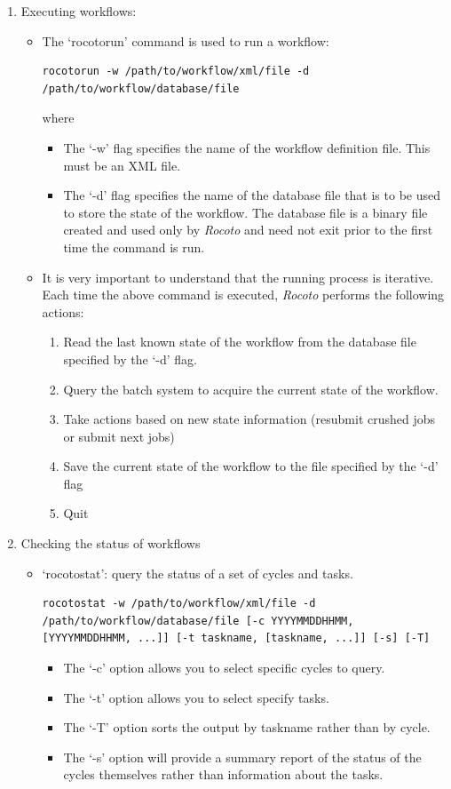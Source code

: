 \documentclass[11pt,fleqn]{report}              %
\begin{document}
\begin{enumerate}
\item Executing workflows:
     \begin{itemize}
     \item The `rocotorun' command is used to run a workflow:
\lstset{language=bash}   
\begin{lstlisting}[frame=trBL]
rocotorun -w /path/to/workflow/xml/file -d /path/to/workflow/database/file
\end{lstlisting}
     where
        \begin{itemize}
     	\item The `-w' flag specifies the name of the workflow definition file. This must be an XML file.
     	\item The `-d' flag specifies the name of the database file that is to be used to store the state of the workflow. The database file is a binary file created and used only by {\it Rocoto} and need not exit prior to the first time the command is run.
     	\end{itemize}
     \item It is very important to understand that the running process is iterative. Each time the above command is executed, {\it Rocoto} performs the following actions:
    	\begin{enumerate}
	\item Read the last known state of the workflow from the database file specified by the `-d' flag.
	\item Query the batch system to acquire the current state of the workflow.
	\item Take actions based on new state information (resubmit crushed jobs or submit next jobs)
	\item Save the current state of the workflow to the file specified by the `-d' flag
	\item Quit 
	\end{enumerate} 
     
     \end{itemize}
     
\item Checking the status of workflows
	\begin{itemize}
	\item `rocotostat': query the status of a set of cycles and tasks.
\lstset{language=bash}   
\begin{lstlisting}[frame=trBL]
rocotostat -w /path/to/workflow/xml/file -d /path/to/workflow/database/file [-c YYYYMMDDHHMM, [YYYYMMDDHHMM, ...]] [-t taskname, [taskname, ...]] [-s] [-T]
\end{lstlisting}
 		\begin{itemize}
		\item The `-c' option allows you to select specific cycles to query.
		\item The `-t' option allows you to select specify tasks.
		\item The `-T' option sorts the output by taskname rather than by cycle.
		\item The `-s' option will provide a summary report of the status of the cycles themselves rather than information about the tasks.
		\end{itemize}


\end{itemize}
\end{enumerate}
\end{document}
